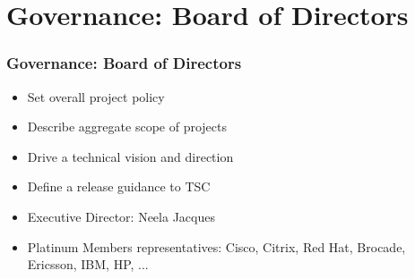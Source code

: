 \section{Governance: Board of Directors}

\begin{frame}
\frametitle{Governance: Board of Directors}

\begin{itemize}
 \item Set overall project policy
 \item Describe aggregate scope of projects
 \item Drive a technical vision and direction
 \item Define a release guidance to TSC
 \item Executive Director: Neela Jacques
 \item Platinum Members representatives: Cisco, Citrix, Red Hat, Brocade, Ericsson, IBM, HP, ...
\end{itemize}

\end{frame}
